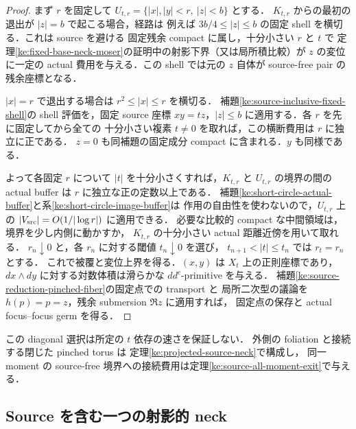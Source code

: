 \begin{proof}
まず $r$ を固定して $U_{t,r}=\{|x|,|y|<r,\ |z|<b\}$ とする．
$K_{t,r}$ からの最初の退出が $|z|=b$ で起こる場合，経路は
例えば $3b/4\le |z|\le b$ の固定 shell を横切る．これは source を避ける
固定残余 compact に属し，十分小さい $r$ と $t$ で
定理\ref{ke:fixed-base-neck-moser}の証明中の射影下界（又は局所積比較）が
$z$ の変位に一定の actual 費用を与える．この shell では元の $z$ 自体が
source-free pair の残余座標となる．

$|x|=r$ で退出する場合は $r^2\le|x|\le r$ を横切る．
補題\ref{ke:source-inclusive-fixed-shell}の shell 評価を，固定 source 座標
$xy=tz$，$|z|\le b$ に適用する．各 $r$ を先に固定してから全ての
十分小さい複素 $t\ne0$ を取れば，この横断費用は $r$ に独立に正である．
$z=0$ も同補題の固定成分 compact に含まれる．$y$ も同様である．

よって各固定 $r$ について $|t|$ を十分小さくすれば，$K_{t,r}$ と
$U_{t,r}$ の境界の間の actual buffer は $r$ に独立な正の定数以上である．
補題\ref{ke:short-circle-actual-buffer}と系\ref{ke:short-circle-image-buffer}は
作用の自由性を使わないので，$U_{t,r}$ 上の
$|V_{\rm src}|=O(1/|\log r|)$ に適用できる．
必要な比較的 compact な中間領域は，境界を少し内側に動かすか，
$K_{t,r}$ の十分小さい actual 距離近傍を用いて取れる．
$r_n\downarrow0$ と，各 $r_n$ に対する閾値 $t_n\downarrow0$ を選び，
$t_{n+1}<|t|\le t_n$ では $r_t=r_n$ とする．
これで被覆と変位上界を得る．$(x,y)$ は $X_t$ 上の正則座標であり，
$dx\wedge dy$ に対する対数体積は滑らかな $dd^c$-primitive を与える．
補題\ref{ke:source-reduction-pinched-fiber}の固定点での transport と
局所二次型の議論を $h(p)=p=z$，残余 submersion $\Re z$ に適用すれば，
固定点の保存と actual focus--focus germ を得る．
\end{proof}

この diagonal 選択は所定の $t$ 依存の速さを保証しない．
外側の foliation と接続する閉じた pinched torus は
定理\ref{ke:projected-source-neck}で構成し，
同一 moment の source-free 境界への接続費用は定理\ref{ke:source-all-moment-exit}で与える．

\subsection{Source を含む一つの射影的 neck}

